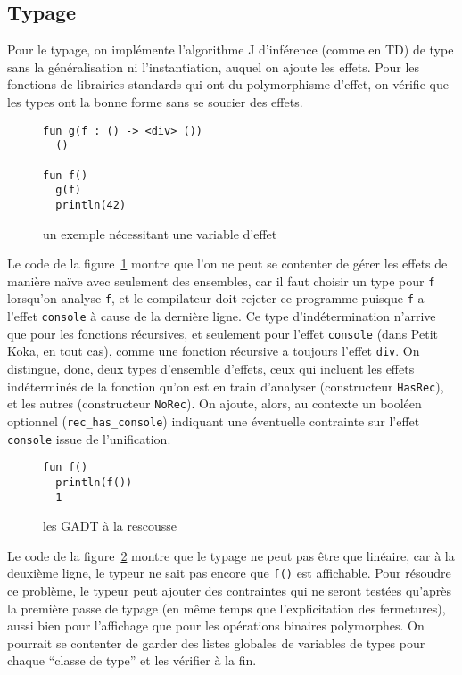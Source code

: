 \documentclass[11pt]{article}
\begin{document}
\subsection{Typage}
Pour le typage, on implémente l'algorithme J d'inférence (comme en TD) de type
sans la généralisation ni l'instantiation, auquel on ajoute les effets. Pour les
fonctions de librairies standards qui ont du polymorphisme d'effet, on vérifie
que les types ont la bonne forme sans se soucier des effets.

\begin{figure}[h]
\begin{verbatim}
fun g(f : () -> <div> ())
  ()

fun f()
  g(f)
  println(42)
\end{verbatim}
\caption{un exemple nécessitant une variable d'effet}\label{code2}
\end{figure}

Le code de la figure~\ref{code2} montre que l'on ne peut se contenter de gérer
les effets de manière naïve avec seulement des ensembles, car il faut choisir un
type pour \texttt{f} lorsqu'on analyse \texttt{f}, et le compilateur doit
rejeter ce programme puisque \texttt{f} a l'effet \texttt{console} à cause de la
dernière ligne. Ce type d'indétermination n'arrive que pour les fonctions
récursives, et seulement pour l'effet \texttt{console} (dans \textsf{Petit
  Koka}, en tout cas), comme une fonction récursive a toujours l'effet
\texttt{div}. On distingue, donc, deux types d'ensemble d'effets, ceux qui
incluent les effets indéterminés de la fonction qu'on est en train d'analyser
(constructeur \texttt{HasRec}), et les autres (constructeur \texttt{NoRec}). On
ajoute, alors, au contexte un booléen optionnel (\texttt{rec\_has\_console})
indiquant une éventuelle contrainte sur l'effet \texttt{console} issue de
l'unification.

\begin{figure}[h]
\begin{verbatim}
fun f()
  println(f())
  1
\end{verbatim}
\caption{les GADT à la rescousse}\label{code1}
\end{figure}

Le code de la figure~\ref{code1} montre que le typage ne peut pas être que
linéaire, car à la deuxième ligne, le typeur ne sait pas encore que \texttt{f()}
est affichable. Pour résoudre ce problème, le typeur peut ajouter des
contraintes qui ne seront testées qu'après la première passe de typage (en même
temps que l'explicitation des fermetures), aussi bien pour l'affichage que pour
les opérations binaires polymorphes. On pourrait se contenter de garder des
listes globales de variables de types pour chaque ``classe de type'' et les
vérifier à la fin.
\end{document}
